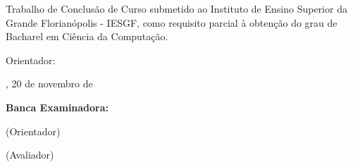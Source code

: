 \begin{folhadeaprovacao}
    \centering
    \imprimirautor
    
    \vspace*{2.5cm}
    
    \begin{citacao}
        Trabalho de Conclusão de Curso submetido ao Instituto de Ensino
        Superior da
        Grande Florianópolis - IESGF, como requisito parcial à obtenção do grau
        de Bacharel em Ciência da Computação.
        
        Orientador: \imprimirorientador
    \end{citacao}
    
    \vspace*{1cm}
    
    \large{\imprimirlocal, 20 de novembro de \imprimirdata}
    
    \vspace*{1cm}
    
    \textbf{Banca Examinadora:}
    
    \vspace*{1cm}
    
    \assinatura{\imprimirorientador}
    (Orientador)
    
    (Avaliador)
    
    \vspace*{1cm}

\end{folhadeaprovacao}



















